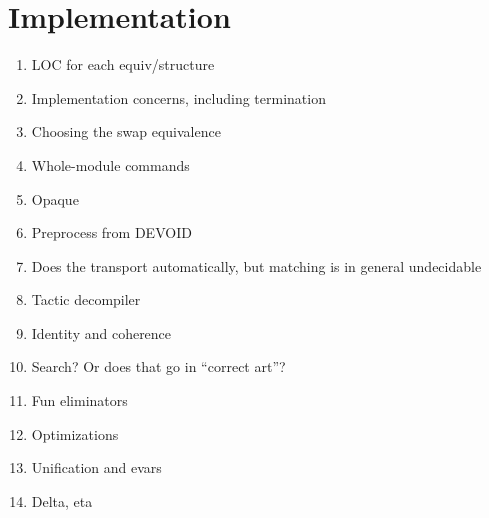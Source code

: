 \section{Implementation}

\begin{enumerate}
\item LOC for each equiv/structure
\item Implementation concerns, including termination
\item Choosing the swap equivalence
\item Whole-module commands
\item Opaque
\item Preprocess from DEVOID
\item Does the transport automatically, but matching is in general undecidable
\item Tactic decompiler
\item Identity and coherence
\item Search? Or does that go in ``correct art''?
\item Fun eliminators
\item Optimizations
\item Unification and evars
\item Delta, eta
\end{enumerate}
